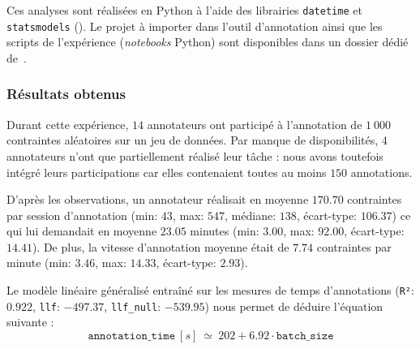 			\begin{leftBarInformation}
				Ces analyses sont réalisées en Python à l'aide des librairies \texttt{datetime} et \texttt{statsmodels} (\cite{seabold:2010}).
				Le projet à importer dans l'outil d'annotation ainsi que les scripts de l'expérience (\textit{notebooks} Python) sont disponibles dans un dossier dédié de~\cite{schild:cognitivefactory-interactive-clustering-comparative-study:2021}.
			\end{leftBarInformation}

		\subsubsection{Résultats obtenus}
		
			Durant cette expérience, $14$ annotateurs ont participé à l'annotation de $1~000$ contraintes aléatoires sur un jeu de données.
			Par manque de disponibilités, $4$ annotateurs n'ont que partiellement réalisé leur tâche : nous avons toutefois intégré leurs participations car elles contenaient toutes au moins $150$ annotations.
			
			D'après les observations, un annotateur réalisait en moyenne $170.70$ contraintes par session d'annotation (min: $43$, max: $547$, médiane: $138$, écart-type: $106.37$) ce qui lui demandait en moyenne $23.05$ minutes (min: $3.00$, max: $92.00$, écart-type: $14.41$).
			De plus, la vitesse d'annotation moyenne était de $7.74$ contraintes par minute (min: $3.46$, max: $14.33$, écart-type: $2.93$).
			
			Le modèle linéaire généralisé entraîné sur les mesures de temps d'annotations (\texttt{R²}: $0.922$, \texttt{llf}: $-497.37$, \texttt{llf\_null}: $-539.95$) nous permet de déduire l'équation suivante :
			\begin{equation}
				\texttt{annotation\_time}~[s]~
				\simeq~202 + 6.92 \cdot \texttt{batch\_size}
			\end{equation}
		
